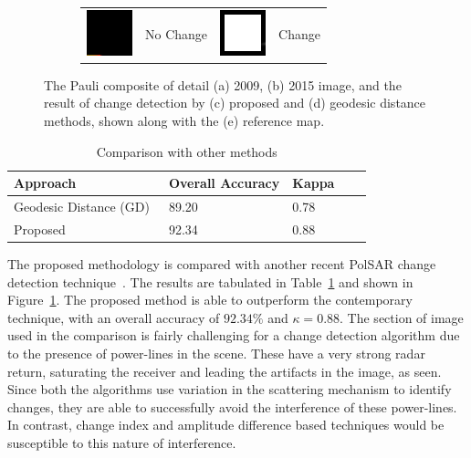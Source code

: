 \begin{figure}[t]
\begin{subfigure}[b]{\columnwidth}
\centering
		\vspace{0.2em}
		\begin{tabular}{c l  c l  }
		 \includegraphics[width=0.02\columnwidth]{Figures/CD/BLK} & No Change   &
		 \includegraphics[width=0.02\columnwidth]{Figures/CD/WHT} & Change
		\end{tabular}
\end{subfigure}
\caption{The Pauli composite of detail (a) 2009, (b) 2015 image, and the result of change detection by (c) proposed and (d) geodesic distance methods, shown along with the (e) reference map.}
\label{fig:comparedeb}
\end{figure}

\begin{table}[]
\centering
\caption{Comparison with other methods}
\label{tab:comparedebanshu}
\begin{tabular}{l|llll}
Approach             & Overall Accuracy & Kappa &  &  \\ \hline
Geodesic Distance (GD)~\cite{ratha2017change}    & 89.20            & 0.78  &  &  \\
Proposed             & 92.34            & 0.88  &  & 
\end{tabular}
\end{table}

The proposed methodology is compared with another recent PolSAR change detection technique~\cite{ratha2017change}. The results are tabulated in Table~\ref{tab:comparedebanshu} and shown in Figure~\ref{fig:comparedeb}. The proposed method is able to outperform the contemporary technique, with an overall accuracy of $92.34\%$ and $\kappa=0.88$. The section of image used in the comparison is fairly challenging for a change detection algorithm due to the presence of power-lines in the scene. These have a very strong radar return, saturating the receiver and leading the artifacts in the image, as seen. Since both the algorithms use variation in the scattering mechanism to identify changes, they are able to successfully avoid the interference of these power-lines. In contrast, change index and amplitude difference based techniques would be susceptible to this nature of interference. 

